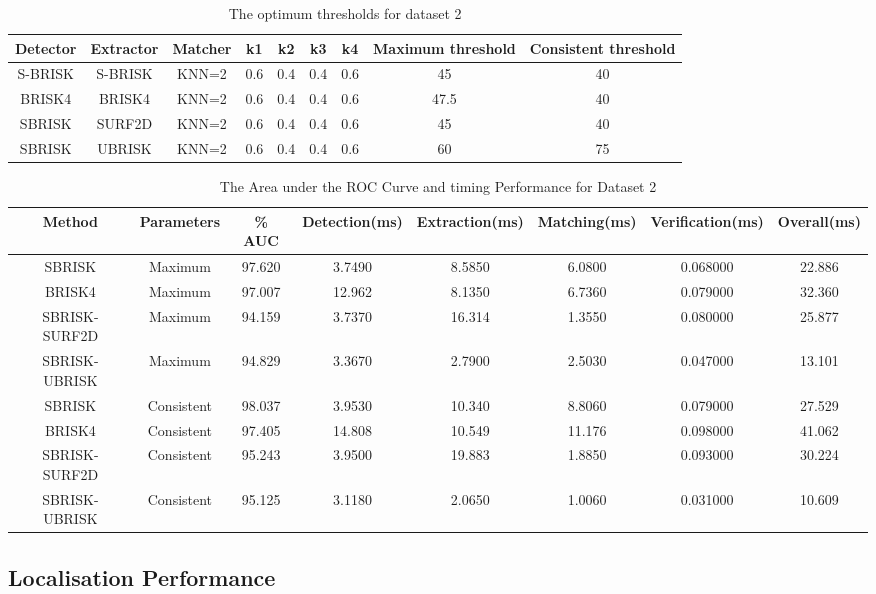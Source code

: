 \documentclass{article}
\begin{document}
\begin{table}
\caption{The optimum thresholds for dataset 2}
\begin{tabular}{|c|c|c|c|c|c|c|c|c|}
\hline 
Detector & Extractor & Matcher & k1 & k2 & k3 & k4 & Maximum threshold & Consistent threshold\tabularnewline
\hline 
\hline 
S-BRISK & S-BRISK & KNN=2 & 0.6 & 0.4 & 0.4 & 0.6 & 45 & 40\tabularnewline
\hline 
BRISK4 & BRISK4 & KNN=2 & 0.6 & 0.4 & 0.4 & 0.6 & 47.5 & 40\tabularnewline
\hline 
SBRISK & SURF2D & KNN=2 & 0.6 & 0.4 & 0.4 & 0.6 & 45 & 40\tabularnewline
\hline 
SBRISK & UBRISK & KNN=2 & 0.6 & 0.4 & 0.4 & 0.6 & 60 & 75\tabularnewline
\hline 
\end{tabular}
\label{sec:dataset2OptimalThresholds}
\end{table}


\begin{table}
\caption{The Area under the ROC Curve and timing Performance for Dataset 2}
\footnotesize
\begin{tabular}{|c|c|c|c|c|c|c|c|}
\hline 
Method & Parameters & \% AUC & Detection(ms) & Extraction(ms) & Matching(ms) & Verification(ms) & Overall(ms)\tabularnewline
\hline 
\hline 
SBRISK & Maximum & 97.620 & 3.7490 & 8.5850 & 6.0800 & 0.068000 & 22.886\tabularnewline
\hline 
BRISK4 & Maximum & 97.007 & 12.962 & 8.1350 & 6.7360 & 0.079000 & 32.360\tabularnewline
\hline 
SBRISK-SURF2D & Maximum & 94.159 & 3.7370 & 16.314 & 1.3550 & 0.080000 & 25.877\tabularnewline
\hline 
SBRISK-UBRISK & Maximum & 94.829 & 3.3670 & 2.7900 & 2.5030 & 0.047000 & 13.101\tabularnewline
\hline 
SBRISK & Consistent & 98.037 & 3.9530 & 10.340 & 8.8060 & 0.079000 & 27.529\tabularnewline
\hline 
BRISK4 & Consistent & 97.405 & 14.808 & 10.549 & 11.176 & 0.098000 & 41.062\tabularnewline
\hline 
SBRISK-SURF2D & Consistent & 95.243 & 3.9500 & 19.883 & 1.8850 & 0.093000 & 30.224\tabularnewline
\hline 
SBRISK-UBRISK & Consistent & 95.125 & 3.1180 & 2.0650 & 1.0060 & 0.031000 & 10.609\tabularnewline
\hline 
\end{tabular}
\label{tab:dataset2Stats}
\end{table}




\subsection{Localisation Performance}
\label{sec:localisationPerformance}
\end{document}
